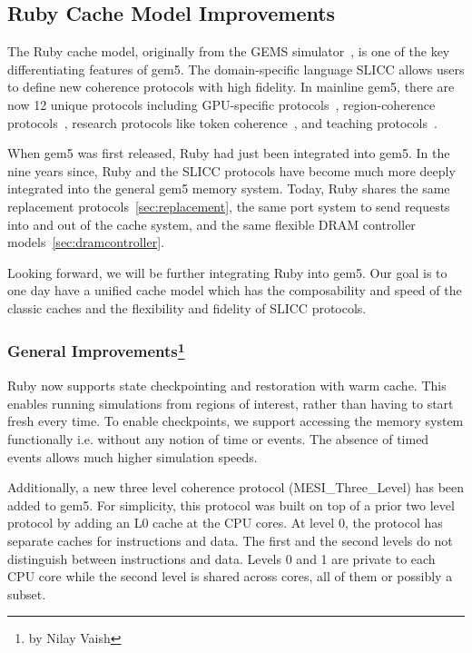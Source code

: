 \subsection[Ruby Cache Model Improvements]{Ruby Cache Model Improvements}
\label{sec:ruby}

The Ruby cache model, originally from the GEMS simulator~\cite{}, is one of the key differentiating features of gem5.
The domain-specific language SLICC allows users to define new coherence protocols with high fidelity.
In mainline gem5, there are now 12 unique protocols including GPU-specific protocols~\cite{viper}, region-coherence protocols~\cite{Power2012hsc}, research protocols like token coherence~\cite{token-coherence}, and teaching protocols~\cite{coherence-primer}.

When gem5 was first released, Ruby had just been integrated into gem5.
In the nine years since, Ruby and the SLICC protocols have become much more deeply integrated into the general gem5 memory system.
Today, Ruby shares the same replacement protocols~\ref{sec:replacement}, the same port system to send requests into and out of the cache system, and the same flexible DRAM controller models~\ref{sec:dramcontroller}.

Looking forward, we will be further integrating Ruby into gem5.
Our goal is to one day have a unified cache model which has the composability and speed of the classic caches and the flexibility and fidelity of SLICC protocols.

\subsubsection[General Improvements]{General Improvements\footnote{by Nilay Vaish}}

Ruby now supports state checkpointing and restoration with warm cache.
This enables running simulations from regions of interest, rather than having to start fresh every time.
To enable checkpoints, we support accessing the memory system functionally i.e. without any notion of time or events.
The absence of timed events allows much higher simulation speeds.

Additionally, a new three level coherence protocol (MESI\_Three\_Level) has been added to gem5.
For simplicity, this protocol was built on top of a prior two level protocol by adding an L0 cache at the CPU cores.
At level 0, the protocol has separate caches for instructions and data.
The first and the second levels do not distinguish between instructions and data.
Levels 0 and 1 are private to each CPU core while the second level is shared across cores, all of them or possibly a subset.

